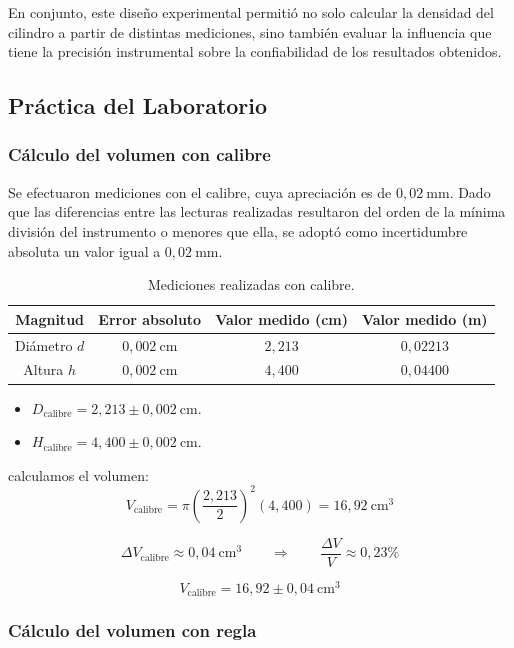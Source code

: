 En conjunto, este diseño experimental permitió no solo calcular la densidad del cilindro a partir de distintas mediciones, sino también evaluar la influencia que tiene la precisión instrumental sobre la confiabilidad de los resultados obtenidos.

\subsection{Práctica del Laboratorio}

\subsubsection{Cálculo del volumen con calibre}
Se efectuaron mediciones con el calibre, cuya apreciación es de $0{,}02\ \mathrm{mm}$. Dado que las diferencias entre las lecturas realizadas resultaron del orden de la mínima división del instrumento o menores que ella, se adoptó como incertidumbre absoluta un valor igual a $0{,}02\ \mathrm{mm}$.

\begin{table}[h!]
\centering
\begin{tabular}{|c|c|c|c|}
\hline
\textbf{Magnitud} & \textbf{Error absoluto} & \textbf{Valor medido (cm)} & \textbf{Valor medido (m)} \\ \hline
Diámetro $d$ & $0{,}002\ \mathrm{cm}$ & $2{,}213$ & $0{,}02213$ \\ \hline
Altura $h$   & $0{,}002\ \mathrm{cm}$ & $ 4{,}400$ & $0{,}04400$ \\ \hline
\end{tabular}
\caption{Mediciones realizadas con calibre.}
\end{table}

\begin{itemize}
    \item $D_{\text{calibre}} = 2{,}213 \pm 0{,}002\ \text{cm}$.
    \item $H_{\text{calibre}} = 4{,}400 \pm 0{,}002\ \text{cm}$.
\end{itemize}

calculamos el volumen:
\[
V_{\text{calibre}} = \pi \left( \frac{2{,}213}{2} \right)^2 (4{,}400) = 16{,}92\ \text{cm}^3
\]

\[
\Delta V_{\text{calibre}} \approx 0{,}04\ \text{cm}^3
\qquad \Rightarrow \qquad
\frac{\Delta V}{V} \approx 0{,}23\%
\]

\[
V_{\text{calibre}} = 16{,}92 \pm 0{,}04 \ \text{cm}^3
\]

\subsubsection{Cálculo del volumen con regla}

